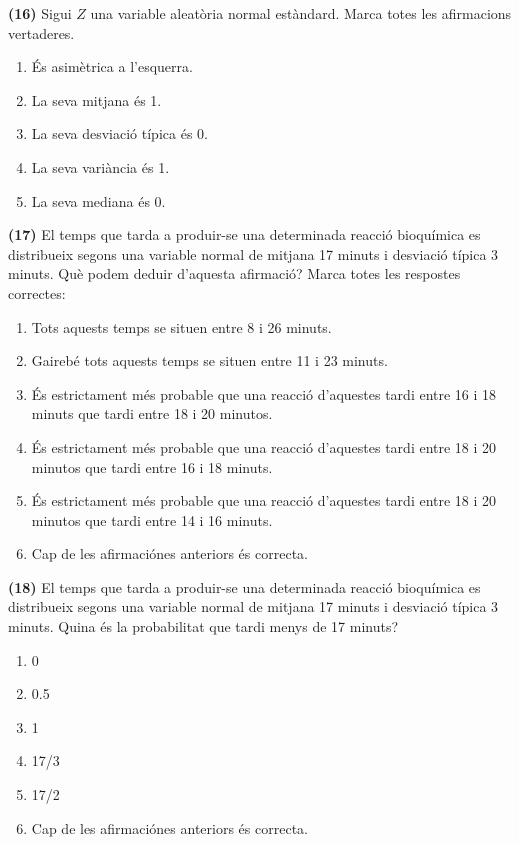 \documentclass[
]{book}
\providecommand{\tightlist}{%
  \setlength{\itemsep}{0pt}\setlength{\parskip}{0pt}}
\theoremstyle{definition}
\theoremstyle{definition}
\theoremstyle{definition}
\theoremstyle{remark}
\begin{document}
\textbf{(16)} Sigui \(Z\) una variable aleatòria normal estàndard. Marca totes les afirmacions vertaderes.

\begin{enumerate}
\def\labelenumi{\arabic{enumi}.}
\tightlist
\item
  És asimètrica a l'esquerra.
\item
  La seva mitjana és 1.
\item
  La seva desviació típica és 0.
\item
  La seva variància és 1.
\item
  La seva mediana és 0.
\end{enumerate}

\textbf{(17)} El temps que tarda a produir-se una determinada reacció bioquímica es distribueix segons una variable normal de mitjana 17 minuts i desviació típica 3 minuts. Què podem deduir d'aquesta afirmació? Marca totes les respostes correctes:

\begin{enumerate}
\def\labelenumi{\arabic{enumi}.}
\tightlist
\item
  Tots aquests temps se situen entre 8 i 26 minuts.
\item
  Gairebé tots aquests temps se situen entre 11 i 23 minuts.
\item
  És estrictament més probable que una reacció d'aquestes tardi entre 16 i 18 minuts que tardi entre 18 i 20 minutos.
\item
  És estrictament més probable que una reacció d'aquestes tardi entre 18 i 20 minutos que tardi entre 16 i 18 minuts.
\item
  És estrictament més probable que una reacció d'aquestes tardi entre 18 i 20 minutos que tardi entre 14 i 16 minuts.
\item
  Cap de les afirmaciónes anteriors és correcta.
\end{enumerate}

\textbf{(18)} El temps que tarda a produir-se una determinada reacció bioquímica es distribueix segons una variable normal de mitjana 17 minuts i desviació típica 3 minuts. Quina és la probabilitat que tardi menys de 17 minuts?

\begin{enumerate}
\def\labelenumi{\arabic{enumi}.}
\tightlist
\item
  0
\item
  0.5
\item
  1
\item
  17/3
\item
  17/2
\item
  Cap de les afirmaciónes anteriors és correcta.
\end{enumerate}
\end{document}

